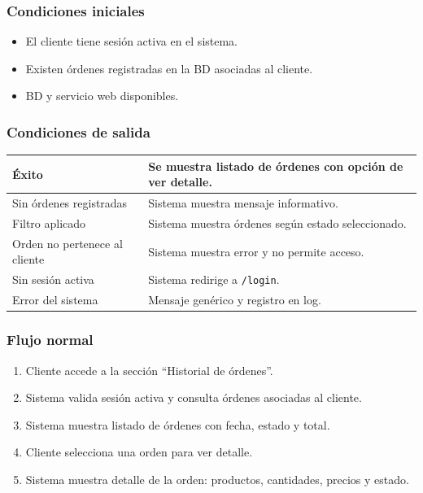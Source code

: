 \documentclass[12pt,a4paper]{article}
\begin{document}
\subsubsection*{Condiciones iniciales}
\begin{itemize}[label=--]
    \item El cliente tiene sesión activa en el sistema.
    \item Existen órdenes registradas en la BD asociadas al cliente.
    \item BD y servicio web disponibles.
\end{itemize}

\subsubsection*{Condiciones de salida}
\begin{longtable}{|l|p{10cm}|}
    \hline
    Éxito                         & Se muestra listado de órdenes con opción de ver detalle. \\ \hline
    Sin órdenes registradas       & Sistema muestra mensaje informativo.                     \\ \hline
    Filtro aplicado               & Sistema muestra órdenes según estado seleccionado.       \\ \hline
    Orden no pertenece al cliente & Sistema muestra error y no permite acceso.               \\ \hline
    Sin sesión activa             & Sistema redirige a \texttt{/login}.                      \\ \hline
    Error del sistema             & Mensaje genérico y registro en log.                      \\ \hline
\end{longtable}

\subsubsection*{Flujo normal}
\begin{enumerate}[label=FN-\arabic*]
    \item Cliente accede a la sección “Historial de órdenes”.
    \item Sistema valida sesión activa y consulta órdenes asociadas al cliente.
    \item Sistema muestra listado de órdenes con fecha, estado y total.
    \item Cliente selecciona una orden para ver detalle.
    \item Sistema muestra detalle de la orden: productos, cantidades, precios y estado.
\end{enumerate}
\end{document}
